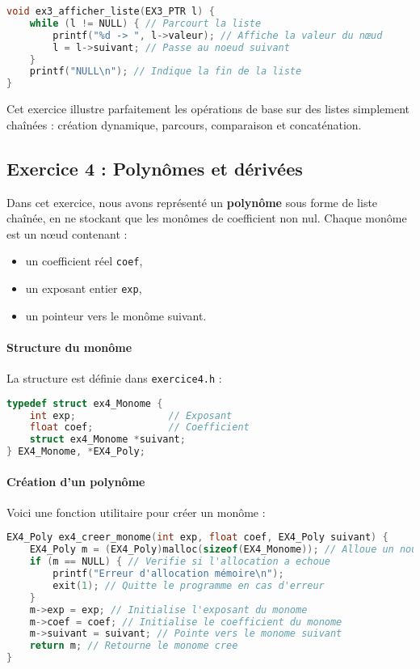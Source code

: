 \documentclass[a4paper,12pt]{article}
\begin{document}
\begin{lstlisting}[language=C, caption={Affichage d'une liste}]
void ex3_afficher_liste(EX3_PTR l) {
    while (l != NULL) { // Parcourt la liste
        printf("%d -> ", l->valeur); // Affiche la valeur du nœud
        l = l->suivant; // Passe au noeud suivant
    }
    printf("NULL\n"); // Indique la fin de la liste
}
\end{lstlisting}

Cet exercice illustre parfaitement les opérations de base sur des listes simplement chaînées : création dynamique, parcours, comparaison et concaténation.


\subsection{Exercice 4 : Polynômes et dérivées}

Dans cet exercice, nous avons représenté un \textbf{polynôme} sous forme de liste chaînée, en ne stockant que les monômes de coefficient non nul. Chaque monôme est un nœud contenant :
\begin{itemize}
    \item un coefficient réel \texttt{coef},
    \item un exposant entier \texttt{exp},
    \item un pointeur vers le monôme suivant.
\end{itemize}

\paragraph{Structure du monôme}

La structure est définie dans \texttt{exercice4.h} :

\begin{lstlisting}[language=C, caption={Structure d’un monôme}]
typedef struct ex4_Monome {
    int exp;                // Exposant
    float coef;             // Coefficient
    struct ex4_Monome *suivant;
} EX4_Monome, *EX4_Poly;
\end{lstlisting}

\paragraph{Création d’un polynôme}

Voici une fonction utilitaire pour créer un monôme :

\begin{lstlisting}[language=C, caption={Création d’un monôme}]
EX4_Poly ex4_creer_monome(int exp, float coef, EX4_Poly suivant) {
    EX4_Poly m = (EX4_Poly)malloc(sizeof(EX4_Monome)); // Alloue un nouveau monome
    if (m == NULL) { // Verifie si l'allocation a echoue
        printf("Erreur d'allocation mémoire\n");
        exit(1); // Quitte le programme en cas d'erreur
    }
    m->exp = exp; // Initialise l'exposant du monome
    m->coef = coef; // Initialise le coefficient du monome
    m->suivant = suivant; // Pointe vers le monome suivant
    return m; // Retourne le monome cree
}
\end{lstlisting}
\end{document}
